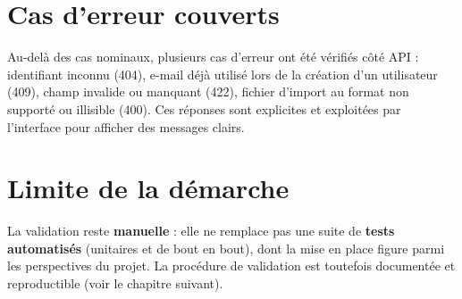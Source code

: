 \section{Cas d'erreur couverts}

Au-delà des cas nominaux, plusieurs cas d'erreur ont été vérifiés côté API :
identifiant inconnu (404), e-mail déjà utilisé lors de la création d'un
utilisateur (409), champ invalide ou manquant (422), fichier d'import au
format non supporté ou illisible (400). Ces réponses sont explicites et
exploitées par l'interface pour afficher des messages clairs.

\section{Limite de la démarche}

La validation reste \textbf{manuelle} : elle ne remplace pas une suite de
\textbf{tests automatisés} (unitaires et de bout en bout), dont la mise en
place figure parmi les perspectives du projet. La procédure de validation est
toutefois documentée et reproductible (voir le chapitre suivant).
